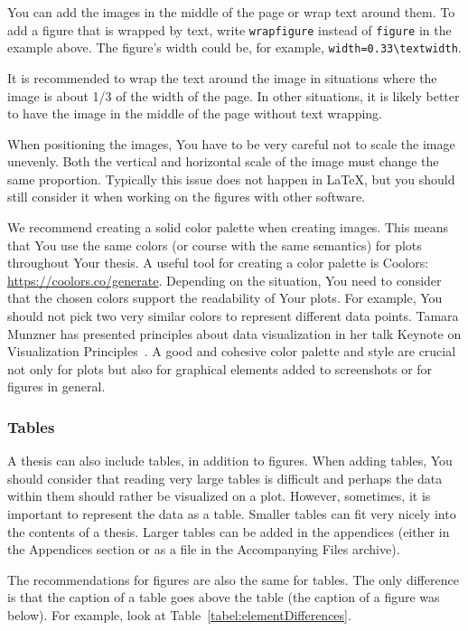 You can add the images in the middle of the page or wrap text around them. To add a figure that is wrapped by text, write \verb|wrapfigure| instead of \verb|figure| in the example above. The figure's width could be, for example, \verb|width=0.33\textwidth|.

It is recommended to wrap the text around the image in situations where the image is about 1/3 of the width of the page. In other situations, it is likely better to have the image in the middle of the page without text wrapping.

When positioning the images, You have to be very careful not to scale the image unevenly. Both the vertical and horizontal scale of the image must change the same proportion. Typically this issue does not happen in LaTeX, but you should still consider it when working on the figures with other software.


We recommend creating a solid color palette when creating images. This means that You use the same colors (or course with the same semantics) for plots throughout Your thesis. A useful tool for creating a color palette is Coolors: \url{https://coolors.co/generate}. Depending on the situation, You need to consider that the chosen colors support the readability of Your plots. For example, You should not pick two very similar colors to represent different data points. Tamara Munzner has presented principles about data visualization in her talk Keynote on Visualization Principles~\cite{tamara_munzner_keynote_2012}. A good and cohesive color palette and style are crucial not only for plots but also for graphical elements added to screenshots or for figures in general.

\subsubsection{Tables}
A thesis can also include tables, in addition to figures. When adding tables, You should consider that reading very large tables is difficult and perhaps the data within them should rather be visualized on a plot. However, sometimes, it is important to represent the data as a table. Smaller tables can fit very nicely into the contents of a thesis. Larger tables can be added in the appendices (either in the Appendices section or as a file in the Accompanying Files archive).

The recommendations for figures are also the same for tables. The only difference is that the caption of a table goes above the table (the caption of a figure was below). For example, look at Table~\ref{tabel:elementDifferences}.

